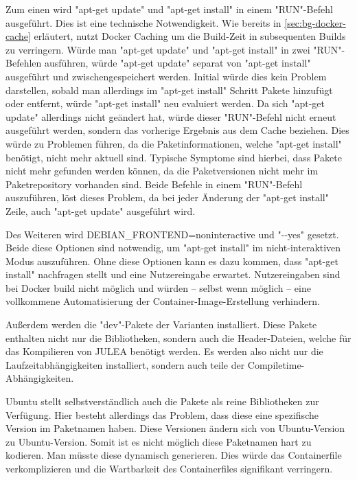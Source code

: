Zum einen wird "apt-get update" und "apt-get install" in einem "RUN"-Befehl ausgeführt. Dies ist eine technische Notwendigkeit. Wie bereits in \cref{sec:bg-docker-cache} erläutert, nutzt Docker Caching um die Build-Zeit in subsequenten Builds zu verringern. Würde man "apt-get update" und "apt-get install" in zwei "RUN"-Befehlen ausführen, würde "apt-get update" separat von "apt-get install" ausgeführt und zwischengespeichert werden. Initial würde dies kein Problem darstellen, sobald man allerdings im "apt-get install" Schritt Pakete hinzufügt oder entfernt, würde "apt-get install" neu evaluiert werden. Da sich "apt-get update" allerdings nicht geändert hat, würde dieser "RUN"-Befehl nicht erneut ausgeführt werden, sondern das vorherige Ergebnis aus dem Cache beziehen. Dies würde zu Problemen führen, da die Paketinformationen, welche "apt-get install" benötigt, nicht mehr aktuell sind. Typische Symptome sind hierbei, dass Pakete nicht mehr gefunden werden können, da die Paketversionen nicht mehr im Paketrepository vorhanden sind. Beide Befehle in einem "RUN"-Befehl auszuführen, löst dieses Problem, da bei jeder Änderung der "apt-get install" Zeile, auch "apt-get update" ausgeführt wird.

Des Weiteren wird DEBIAN\_FRONTEND=noninteractive und "\hyphen{}\hyphen{}yes" gesetzt. Beide diese Optionen sind notwendig, um "apt-get install" im nicht-interaktiven Modus auszuführen. Ohne diese Optionen kann es dazu kommen, dass "apt-get install" nachfragen stellt und eine Nutzereingabe erwartet. Nutzereingaben sind bei Docker build nicht möglich und würden – selbst wenn möglich – eine vollkommene Automatisierung der Container-Image-Erstellung verhindern.

Außerdem werden die "dev"-Pakete der Varianten installiert. Diese Pakete enthalten nicht nur die Bibliotheken, sondern auch die Header-Dateien, welche für das Kompilieren von JULEA benötigt werden. Es werden also nicht nur die Laufzeitabhängigkeiten installiert, sondern auch teile der Compiletime-Abhängigkeiten.

Ubuntu stellt selbstverständlich auch die Pakete als reine Bibliotheken zur Verfügung. Hier besteht allerdings das Problem, dass diese eine spezifische Version im Paketnamen haben. Diese Versionen ändern sich von Ubuntu-Version zu Ubuntu-Version. Somit ist es nicht möglich diese Paketnamen hart zu kodieren. Man müsste diese dynamisch generieren. Dies würde das Containerfile verkomplizieren und die Wartbarkeit des Containerfiles signifikant verringern. 

